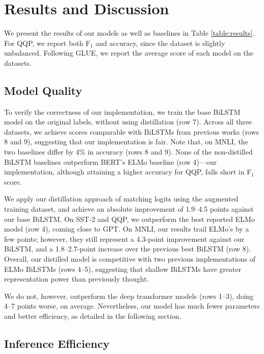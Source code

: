\documentclass[11pt,a4paper]{article}
\begin{document}
\section{Results and Discussion}

We present the results of our models as well as baselines in Table \ref{table:results}.
For QQP, we report both F$_1$ and accuracy, since the dataset is slightly unbalanced.
Following GLUE, we report the average score of each model on the datasets.


\subsection{Model Quality}

To verify the correctness of our implementation, we train the base BiLSTM model on the original labels, without using distillation (row 7).
Across all three datasets, we achieve scores comparable with BiLSTMs from previous works (rows 8 and 9), suggesting that our implementation is fair.
Note that, on MNLI, the two baselines differ by 4\% in accuracy (rows 8 and 9).
None of the non-distilled BiLSTM baselines outperform BERT's ELMo baseline (row 4)---our implementation, although attaining a higher accuracy for QQP, falls short in F$_1$ score.


We apply our distillation approach of matching logits using the augmented training dataset, and achieve an absolute improvement of 1.9--4.5 points against our base BiLSTM.
On SST-2 and QQP, we outperform the best reported ELMo model (row 4), coming close to GPT.
On MNLI, our results trail ELMo's by a few points; however, they still represent a 4.3-point improvement against our BiLSTM, and a 1.8--2.7-point increase over the previous best BiLSTM (row 8). Overall, our distilled model is competitive with two previous implementations of ELMo BiLSTMs (rows 4--5), suggesting that shallow BiLSTMs have greater representation power than previously thought.

We do not, however, outperform the deep transformer models (rows 1--3), doing 4--7 points worse, on average.
Nevertheless, our model has much fewer parameters and better efficiency, as detailed in the following section.










\subsection{Inference Efficiency}
\end{document}

